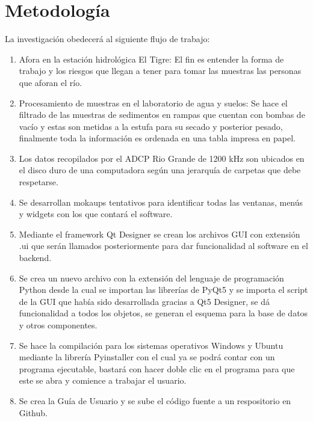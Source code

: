 \documentclass[12pt,a4paper]{report}
\begin{document}
\section{Metodología}
La investigación obedecerá al siguiente flujo de trabajo:
\begin{enumerate}
\item Afora en la estación hidrológica El Tigre: El fin es entender la forma de trabajo y los riesgos que llegan a tener para tomar las muestras las personas que aforan el río.
\item Procesamiento de muestras en el laboratorio de agua y suelos: Se hace el filtrado de las muestras de sedimentos en rampas que cuentan con bombas de vacío y estas son metidas a la estufa para su secado y posterior pesado, finalmente toda la información es ordenada en una tabla impresa en papel.
\item Los datos recopilados por el ADCP Rio Grande de 1200 kHz son ubicados en el disco duro de una computadora según una jerarquía de carpetas que debe respetarse.
\item Se desarrollan mokaups tentativos para identificar todas las ventanas, menús y widgets con los que contará el software.
\item Mediante el framework Qt Designer se crean los archivos GUI con extensión .ui que serán llamados posteriormente para dar funcionalidad al software en el backend.
\item Se crea un nuevo archivo con la extensión del lenguaje de programación Python desde la cual se importan las librerías de PyQt5 y se importa el script de la GUI que había sido desarrollada gracias a Qt5 Designer, se dá funcionalidad a todos los objetos, se generan el esquema para la base de datos y otros componentes.
\item Se hace la compilación para los sistemas operativos Windows y Ubuntu mediante la librería Pyinstaller con el cual ya se podrá contar con un programa ejecutable, bastará con hacer doble clic en el programa para que este se abra y comience a trabajar el usuario.
\item Se crea la Guía de Usuario y se sube el código fuente a un respositorio en Github.
\end{enumerate}
\end{document}
